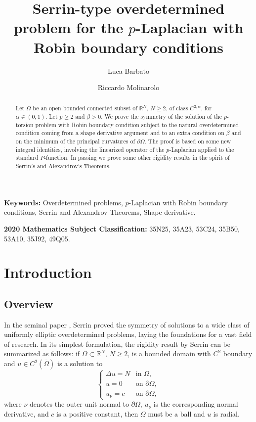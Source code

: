 \documentclass[10pt,a4paper, reqno]{amsart}
\author{Luca Barbato}
\author{Riccardo Molinarolo}
\title[Serrin-type overdetermined problem for the $p$-Laplacian with Robin boundary conditions]{Serrin-type overdetermined problem for the $p$-Laplacian with Robin boundary conditions}
\numberwithin{equation}{section}
\newcommand{\R}{\mathbb{R}}
\begin{document}
\begin{abstract}
Let $\Omega$ be an open bounded connected subset of $\R^N$, $N \geq 2$, of class $C^{2,\alpha}$, for $\alpha \in (0,1)$. Let $p \geq 2$ and $\beta>0$. We prove the symmetry of the solution of the $p$-torsion problem with Robin boundary condition subject to the natural overdetermined condition coming from a shape derivative argument and to an extra condition on $\beta$ and on the minimum of the principal curvatures of $\partial\Omega$. The proof is based on some new integral identities, involving the linearized operator of the $p$-Laplacian applied to the standard $P$-function. In passing we prove some other rigidity results in the spirit of Serrin's and Alexandrov's Theorems.
\end{abstract}

\maketitle

\noindent
{\bf Keywords:} Overdetermined problems, $p$-Laplacian with Robin boundary conditions, Serrin and Alexandrov Theorems, Shape derivative.\par

\bigskip

\noindent   
{{\bf 2020 Mathematics Subject Classification:} 35N25, 35A23, 53C24, 35B50, 53A10, 35J92, 49Q05}.
\bigskip

\tableofcontents

\section{Introduction}

\subsection{Overview}

In the seminal paper \cite{serrin}, Serrin proved the symmetry of solutions to a wide class of uniformly elliptic overdetermined problems, laying the foundations for a vast field of research. In its simplest formulation, the rigidity result by Serrin can be summarized as follows: if $\Omega \subset \mathbb{R}^N$, $N \ge 2$, is a bounded domain with $C^2$ boundary and $u \in C^2(\overline{\Omega})$ is a solution to 
\begin{equation}\label{intro PbD}
\begin{cases}
\Delta u = N &\text{in } \Omega,
\\
u = 0 &\text{on } \partial\Omega,
\\
u_\nu = c &\text{on } \partial\Omega,
\end{cases}
\end{equation}
where $\nu$ denotes the outer unit normal to $\partial\Omega$, $u_\nu$ is the corresponding normal derivative, and $c$ is a positive constant, then $\Omega$ must be a ball and $u$ is radial. 
\end{document}
